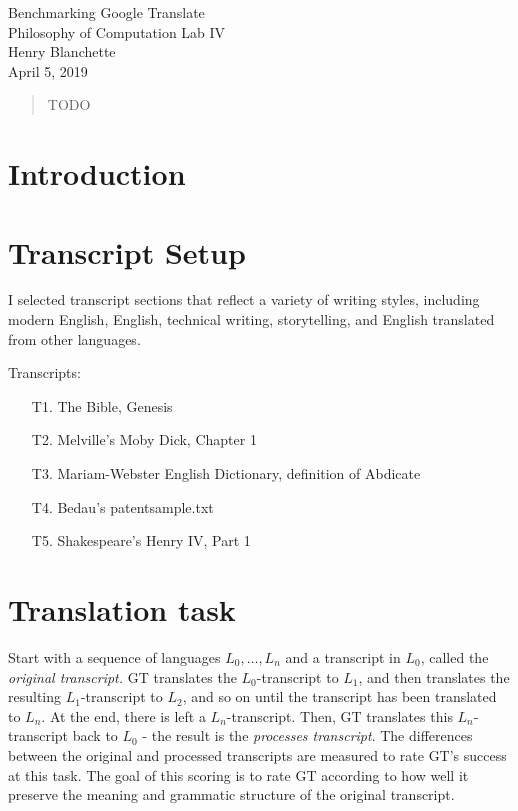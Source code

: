 \documentclass{article}
\begin{document}
\begin{center}{\huge   Benchmarking Google Translate }\\[0.4cm]{\large  Philosophy of Computation Lab IV }\\[0.75cm]{\large  Henry Blanchette }\\[0.5cm]{\large  April 5, 2019 }\\[1.0cm]\begin{abstract}
    TODO
\end{abstract}\end{center} \section{Introduction}\section{Transcript Setup}


I selected transcript sections that reflect a variety of writing styles, including modern English, English, technical writing, storytelling, and English translated from other languages.




\vspace{1em} \noindent
Transcripts:
\begin{enumerate}
  \item[T1.] The Bible, Genesis
  \item[T2.] Melville's Moby Dick, Chapter 1
  \item[T3.] Mariam-Webster English Dictionary, definition of Abdicate
  \item[T4.] Bedau's patentsample.txt
  \item[T5.] Shakespeare's Henry IV, Part 1
\end{enumerate}

\section{Translation task}


Start with a sequence of languages $L_0, \dots, L_n$ and a transcript in $L_0$, called the \textit{original transcript.}
GT translates the $L_0$-transcript to $L_1$, and then translates the resulting $L_1$-transcript to $L_2$, and so on until the transcript has been translated to $L_n$.
At the end, there is left a $L_n$-transcript.
Then, GT translates this $L_n$-transcript back to $L_0$ - the result is the \textit{processes transcript}.
The differences between the original and processed transcripts are measured to rate GT's success at this task.
The goal of this scoring is to rate GT according to how well it preserve the meaning and grammatic structure of the original transcript.
\end{document}
